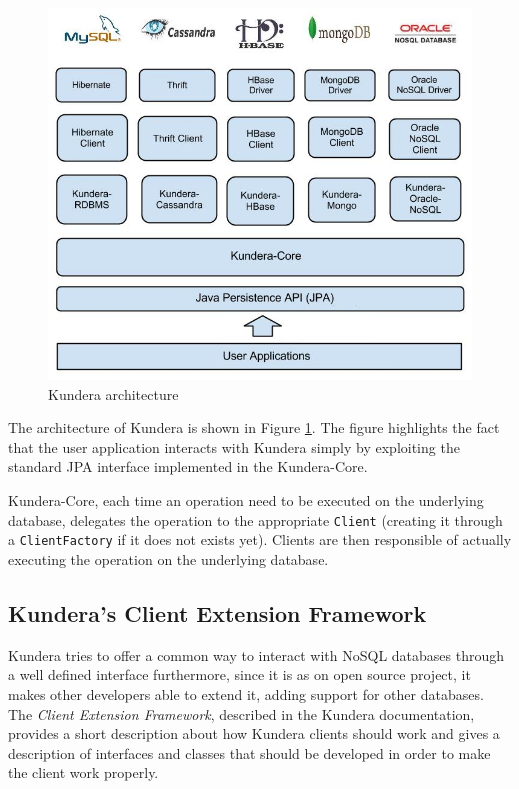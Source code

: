 \begin{figure}[tbh]
  \centering
  \includegraphics[scale=0.5]{images/kundera_architecture}
  \caption{Kundera architecture \cite{online:kundera}}
  \label{fig:kundera_architecture}
\end{figure}

\noindent The architecture of Kundera is shown in Figure \ref{fig:kundera_architecture}. The figure highlights the fact that the user application interacts with Kundera simply by exploiting the standard JPA interface implemented in the Kundera-Core.

\noindent Kundera-Core, each time an operation need to be executed on the underlying database, delegates the operation to the appropriate \texttt{Client} (creating it through a \texttt{ClientFactory} if it does not exists yet). Clients are then responsible of actually executing the operation on the underlying database.

\subsection{Kundera's Client Extension Framework}
Kundera tries to offer a common way to interact with NoSQL databases through a well defined interface furthermore, since it is as on open source project, it makes other developers able to extend it, adding support for other databases.
The \textit{Client Extension Framework}, described in the Kundera documentation, provides a short description about how Kundera clients should work and gives a description of interfaces and classes that should be developed in order to make the client work properly.

